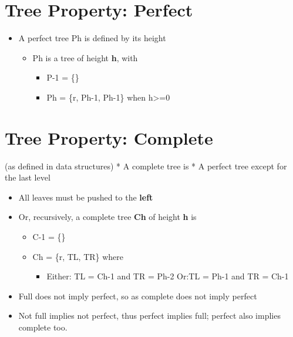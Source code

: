 \documentclass[
]{book}
\providecommand{\tightlist}{%
  \setlength{\itemsep}{0pt}\setlength{\parskip}{0pt}}
\begin{document}
\hypertarget{tree-property-perfect}{%
\section{Tree Property: Perfect}\label{tree-property-perfect}}

\begin{itemize}
\tightlist
\item
  A perfect tree Ph is defined by its height

  \begin{itemize}
  \tightlist
  \item
    Ph is a tree of height \textbf{h}, with

    \begin{itemize}
    \tightlist
    \item
      P-1 = \{\}
    \item
      Ph = \{r, Ph-1, Ph-1\} when h\textgreater=0
    \end{itemize}
  \end{itemize}
\end{itemize}

\hypertarget{tree-property-complete}{%
\section{Tree Property: Complete}\label{tree-property-complete}}

(as defined in data structures)
* A complete tree is
* A perfect tree except for the last level

\begin{itemize}
\item
  All leaves must be pushed to the \textbf{left}
\item
  Or, recursively, a complete tree \textbf{Ch} of height \textbf{h} is

  \begin{itemize}
  \item
    C-1 = \{\}
  \item
    Ch = \{r, TL, TR\} where

    \begin{itemize}
    \tightlist
    \item
      Either: TL = Ch-1 and TR = Ph-2
      Or:TL = Ph-1 and TR = Ch-1
    \end{itemize}
  \end{itemize}
\end{itemize}

\begin{itemize}
\tightlist
\item
  Full does not imply perfect, so as complete does not imply perfect
\item
  Not full implies not perfect, thus perfect implies full; perfect also implies complete too.
\end{itemize}
\end{document}
